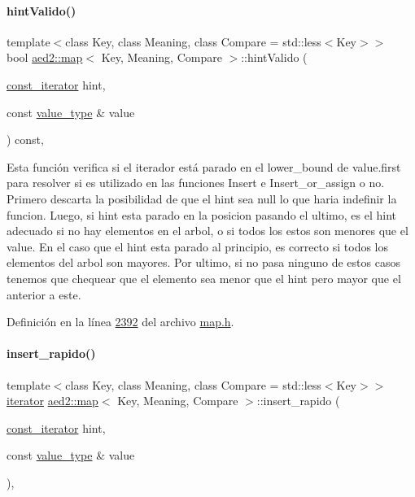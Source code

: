 \paragraph{\texorpdfstring{hint\+Valido()}{hintValido()}}
{\footnotesize\ttfamily template$<$class Key, class Meaning, class Compare = std\+::less$<$\+Key$>$$>$ \\
bool \hyperlink{classaed2_1_1map}{aed2\+::map}$<$ Key, Meaning, Compare $>$\+::hint\+Valido (\begin{DoxyParamCaption}\item[{\hyperlink{classaed2_1_1map_1_1const__iterator}{const\+\_\+iterator}}]{hint,  }\item[{const \hyperlink{classaed2_1_1map_a719db98e0ff9a837610f76be33264680_a719db98e0ff9a837610f76be33264680}{value\+\_\+type} \&}]{value }\end{DoxyParamCaption}) const\hspace{0.3cm}{\ttfamily [inline]}, {\ttfamily [private]}}

Esta función verifica si el iterador está parado en el lower\+\_\+bound de value.\+first para resolver si es utilizado en las funciones Insert e Insert\+\_\+or\+\_\+assign o no. Primero descarta la posibilidad de que el hint sea null lo que haria indefinir la funcion. Luego, si hint esta parado en la posicion pasando el ultimo, es el hint adecuado si no hay elementos en el arbol, o si todos los estos son menores que el value. En el caso que el hint esta parado al principio, es correcto si todos los elementos del arbol son mayores. Por ultimo, si no pasa ninguno de estos casos tenemos que chequear que el elemento sea menor que el hint pero mayor que el anterior a este. 

Definición en la línea \hyperlink{map_8h_source_l02392}{2392} del archivo \hyperlink{map_8h_source}{map.\+h}.

\mbox{\label{classaed2_1_1map_a4b4f1e65ee9aeccee4046d53fd5fd8a4_a4b4f1e65ee9aeccee4046d53fd5fd8a4}} 
\paragraph{\texorpdfstring{insert\+\_\+rapido()}{insert\_rapido()}}
{\footnotesize\ttfamily template$<$class Key, class Meaning, class Compare = std\+::less$<$\+Key$>$$>$ \\
\hyperlink{classaed2_1_1map_1_1iterator}{iterator} \hyperlink{classaed2_1_1map}{aed2\+::map}$<$ Key, Meaning, Compare $>$\+::insert\+\_\+rapido (\begin{DoxyParamCaption}\item[{\hyperlink{classaed2_1_1map_1_1const__iterator}{const\+\_\+iterator}}]{hint,  }\item[{const \hyperlink{classaed2_1_1map_a719db98e0ff9a837610f76be33264680_a719db98e0ff9a837610f76be33264680}{value\+\_\+type} \&}]{value }\end{DoxyParamCaption})\hspace{0.3cm}{\ttfamily [inline]}, {\ttfamily [private]}}


